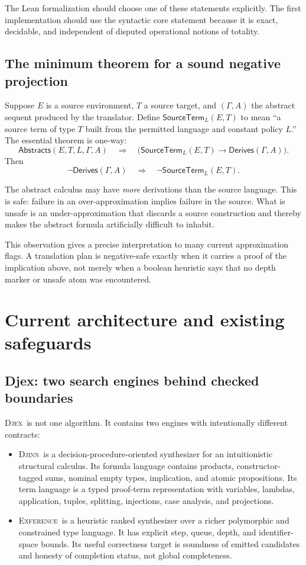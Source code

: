 \documentclass[11pt,letterpaper,openany]{report}
\theoremstyle{definition}
\theoremstyle{remark}
\newcommand{\Djex}{\textsc{Djex}}
\newcommand{\Djinn}{\textsc{Djinn}}
\newcommand{\Exference}{\textsc{Exference}}
\begin{document}
The Lean formalization should choose one of these statements explicitly. The first implementation should use the syntactic core statement because it is exact, decidable, and independent of disputed operational notions of totality.

\section{The minimum theorem for a sound negative projection}
\label{sec:one-way}

Suppose \(E\) is a source environment, \(T\) a source target, and \((\Gamma,A)\) the abstract sequent produced by the translator. Define \(\mathsf{SourceTerm}_L(E,T)\) to mean ``a source term of type \(T\) built from the permitted language and constant policy \(L\).'' The essential theorem is one-way:
\[
  \mathsf{Abstracts}(E,T,L,\Gamma,A)
  \quad\Longrightarrow\quad
  \bigl(\mathsf{SourceTerm}_L(E,T) \to \mathsf{Derives}(\Gamma,A)\bigr).
\]
Then
\[
  \neg\mathsf{Derives}(\Gamma,A)
  \quad\Longrightarrow\quad
  \neg\mathsf{SourceTerm}_L(E,T).
\]

The abstract calculus may have \emph{more} derivations than the source language. This is safe: failure in an over-approximation implies failure in the source. What is unsafe is an under-approximation that discards a source construction and thereby makes the abstract formula artificially difficult to inhabit.

This observation gives a precise interpretation to many current approximation flags. A translation plan is negative-safe exactly when it carries a proof of the implication above, not merely when a boolean heuristic says that no depth marker or unsafe atom was encountered.

\chapter{Current architecture and existing safeguards}
\label{ch:current}

\section{Djex: two search engines behind checked boundaries}

\Djex\ is not one algorithm. It contains two engines with intentionally different contracts:

\begin{itemize}
\item \Djinn\ is a decision-procedure-oriented synthesizer for an intuitionistic structural calculus. Its formula language contains products, constructor-tagged sums, nominal empty types, implication, and atomic propositions. Its term language is a typed proof-term representation with variables, lambdas, application, tuples, splitting, injections, case analysis, and projections.
\item \Exference\ is a heuristic ranked synthesizer over a richer polymorphic and constrained type language. It has explicit step, queue, depth, and identifier-space bounds. Its useful correctness target is soundness of emitted candidates and honesty of completion status, not global completeness.
\end{itemize}
\end{document}
